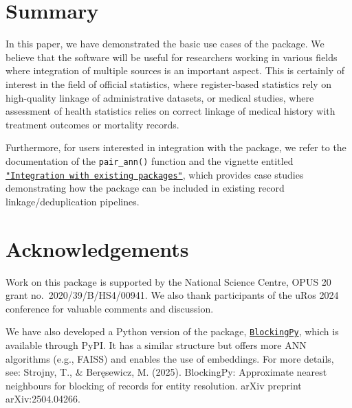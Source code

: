 \section{Summary}\label{summary}

In this paper, we have demonstrated the basic use cases of the
 package. We believe that the software will be useful
for researchers working in various fields where integration of multiple
sources is an important aspect. This is certainly of interest in the
field of official statistics, where register-based statistics rely on
high-quality linkage of administrative datasets, or medical studies, where
assessment of health statistics relies on correct linkage of medical
history with treatment outcomes or mortality records.

Furthermore, for users interested in integration with the 
package, we refer to the documentation of the \texttt{pair\_ann()} function and
the vignette entitled
\href{https://cran.r-project.org/web/packages/blocking/vignettes/v3-integration.html}{\texttt{"Integration\ with\ existing\ packages"}},
which provides case studies demonstrating how the  package can be
included in existing record linkage/deduplication pipelines.

\section{Acknowledgements}\label{acknowledgements}

Work on this package is supported by the National Science Centre, OPUS
20 grant no.~2020/39/B/HS4/00941. We also thank participants of the uRos
2024 conference for valuable comments and discussion.

We have also developed a Python version of the package,
\href{https://blockingpy.readthedocs.io/en/latest/}{\texttt{BlockingPy}}, which is available through PyPI. It has a similar structure but offers more
ANN algorithms (e.g., FAISS) and enables the use of embeddings. For more details,
see: Strojny, T., \& Beręsewicz, M. (2025). BlockingPy: Approximate
nearest neighbours for blocking of records for entity resolution. arXiv
preprint arXiv:2504.04266.



\address{%
Maciej Beręsewicz\\
University of Economics and BusinessStatisical Office in Poznań\\%
Department of Statistics\\ Centre for the Methodology of Population Studies\\
%
\url{https://maciejberesewicz.com}\\%
\textit{ORCiD: \href{https://orcid.org/0000-0002-8281-4301}{0000-0002-8281-4301}}\\%
\href{mailto:maciej.beresewicz@poznan.pl}{\nolinkurl{maciej.beresewicz@poznan.pl}}%
}

\address{%
Adam Struzik\\
Adam Mickiewicz UniversityStatisical Office in Poznań\\%
Faculty of Mathematics and Computer Science\\ Centre for Urban Statistics\\
%
%
%
\href{mailto:adastr5@st.amu.edu.pl}{\nolinkurl{adastr5@st.amu.edu.pl}}%
}

